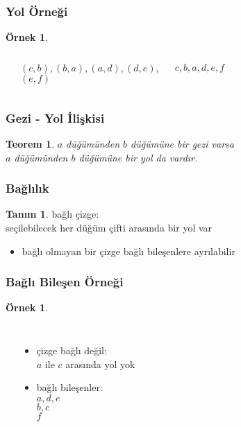 \documentclass[dvipsnames]{beamer}
\theoremstyle{definition}
\newtheorem{tanim}[theorem]{Tanım}
\theoremstyle{example}
\newtheorem{ornek}[theorem]{Örnek}
\theoremstyle{plain}
\newtheorem{teorem}[theorem]{Teorem}
\begin{document}
\begin{frame}
  \frametitle{Yol Örneği}

  \begin{ornek}
    \begin{columns}
      \begin{center}
      \end{center}

      $(c,b),(b,a),(a,d),(d,e),$\\
      $(e,f)$

      \medskip
      $c,b,a,d,e,f$
    \end{columns}
  \end{ornek}
\end{frame}

\begin{frame}
  \frametitle{Gezi - Yol İlişkisi}

  \begin{teorem}
    $a$ düğümünden $b$ düğümüne bir gezi varsa\\
    $a$ düğümünden $b$ düğümüne bir yol da vardır.
  \end{teorem}
\end{frame}

\begin{frame}
  \frametitle{Bağlılık}

  \begin{tanim}
    \alert{bağlı çizge}:\\
    seçilebilecek her düğüm çifti arasında bir yol var
  \end{tanim}

  \pause
  \begin{itemize}
    \item bağlı olmayan bir çizge bağlı bileşenlere ayrılabilir
  \end{itemize}
\end{frame}

\begin{frame}
  \frametitle{Bağlı Bileşen Örneği}

  \begin{ornek}
    \begin{columns}
      \begin{center}
      \end{center}

      \pause
      \begin{itemize}
        \item çizge bağlı değil:\\
          $a$ ile $c$ arasında yol yok
        \item bağlı bileşenler:\\
          $a,d,e$\\
          $b,c$\\
          $f$
      \end{itemize}
    \end{columns}
  \end{ornek}
\end{frame}
\end{document}

